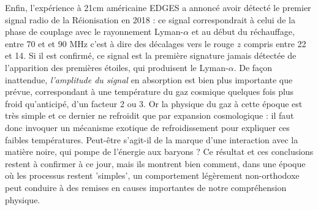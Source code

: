 Enfin, l'expérience à 21cm américaine EDGES  a annoncé avoir détecté le premier signal radio de la Réionisation en 2018 : ce signal correspondrait à celui de la phase de couplage avec le rayonnement Lyman-$\alpha$ et au début du réchauffage, entre 70 et et 90 MHz c'est à dire des décalages vers le rouge $z$ compris entre 22 et 14. Si il est confirmé, ce signal est la première signature jamais détectée de l'apparition des premières étoiles, qui produisent le Lyman-$\alpha$. De façon inattendue, \textit{l'amplitude du signal} en absorption est bien plus importante que prévue, correspondant à une température du gaz cosmique quelques fois plus froid qu'anticipé, d'un facteur 2 ou 3. Or la physique du gaz à cette époque est très simple et ce dernier ne refroidit que par expansion cosmologique : il faut donc invoquer un mécanisme exotique de refroidissement pour expliquer ces faibles températures. Peut-être s'agit-il de la marque d'une interaction avec la matière noire, qui pompe de l'énergie aux baryons ? Ce résultat et ces conclusions restent à confirmer à ce jour, mais ils montrent bien comment, dans une époque où les processus restent 'simples', un comportement légèrement non-orthodoxe peut conduire à des remises en causes importantes de notre compréhension physique.  
  
 